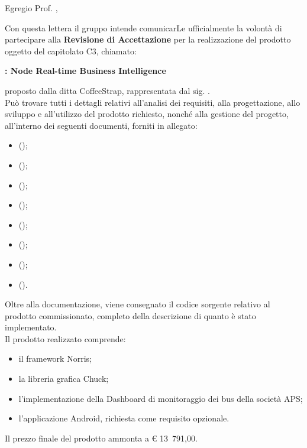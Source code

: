 \documentclass{letter}
\begin{document}
\begin{letter}{}

	\vspace{4cm}
	
	\opening{Egregio Prof. \committente{},}
	
	Con questa lettera il gruppo \groupname{} intende comunicarLe ufficialmente la volontà di partecipare alla \textbf{Revisione di Accettazione} per la realizzazione del prodotto oggetto del capitolato C3, chiamato:
	\begin{center}
		\textbf{\projectname{}: Node Real-time Business Intelligence}
	\end{center}
	proposto dalla ditta CoffeeStrap, rappresentata dal sig. \proponente{}.\\
	Può trovare tutti i dettagli relativi all'analisi dei requisiti, alla progettazione, allo sviluppo e all'utilizzo del prodotto richiesto, nonché alla gestione del progetto, all'interno dei seguenti documenti, forniti in allegato:

	\begin{itemize}
		\item {} ();
		\item {} ();
		\item {} ();
		\item {} ();
		\item {} ();
		\item {} ();
		\item {} ();
		\item {} ().
	\end{itemize}
	
	Oltre alla documentazione, viene consegnato il codice sorgente relativo al prodotto commissionato, completo della descrizione di quanto è stato implementato.\\
	Il prodotto realizzato comprende:
	\begin{itemize}
		\item il framework Norris;
		\item la libreria grafica Chuck;
		\item l'implementazione della Dashboard di monitoraggio dei bus della società APS;
		\item l'applicazione Android, richiesta come requisito opzionale.
	\end{itemize}
	Il prezzo finale del prodotto ammonta a \euro{} 13~791,00.
	

\end{letter}
\end{document}
